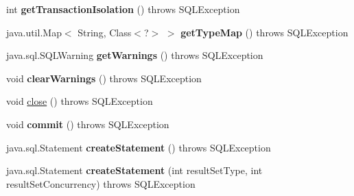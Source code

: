 \begin{DoxyCompactItemize}
\mbox{\label{classcom_1_1mysql_1_1cj_1_1jdbc_1_1_connection_wrapper_a5a460da4650ce588704afa3bc76f20e0}} 
int {\bfseries get\+Transaction\+Isolation} ()  throws S\+Q\+L\+Exception 
\item 
\mbox{\label{classcom_1_1mysql_1_1cj_1_1jdbc_1_1_connection_wrapper_a5937fe77552189bdc479b80bc84bf5df}} 
java.\+util.\+Map$<$ String, Class$<$?$>$ $>$ {\bfseries get\+Type\+Map} ()  throws S\+Q\+L\+Exception 
\item 
\mbox{\label{classcom_1_1mysql_1_1cj_1_1jdbc_1_1_connection_wrapper_a645cbeafc87a13f65c6ca3596837ec10}} 
java.\+sql.\+S\+Q\+L\+Warning {\bfseries get\+Warnings} ()  throws S\+Q\+L\+Exception 
\item 
\mbox{\label{classcom_1_1mysql_1_1cj_1_1jdbc_1_1_connection_wrapper_a4113e07bce13394b2537c5f9e7aba3ae}} 
void {\bfseries clear\+Warnings} ()  throws S\+Q\+L\+Exception 
\item 
void \mbox{\hyperlink{classcom_1_1mysql_1_1cj_1_1jdbc_1_1_connection_wrapper_a1513ad5e208ca46ac61ab5359590a0b9}{close}} ()  throws S\+Q\+L\+Exception 
\item 
\mbox{\label{classcom_1_1mysql_1_1cj_1_1jdbc_1_1_connection_wrapper_af0bc67720997910c2dec3f38b1796ec1}} 
void {\bfseries commit} ()  throws S\+Q\+L\+Exception 
\item 
\mbox{\label{classcom_1_1mysql_1_1cj_1_1jdbc_1_1_connection_wrapper_a7d05b731c9391bc085142ba228bad83a}} 
java.\+sql.\+Statement {\bfseries create\+Statement} ()  throws S\+Q\+L\+Exception 
\item 
\mbox{\label{classcom_1_1mysql_1_1cj_1_1jdbc_1_1_connection_wrapper_a3d31ddf344c72fe4d0f8cb8346cbfc71}} 
java.\+sql.\+Statement {\bfseries create\+Statement} (int result\+Set\+Type, int result\+Set\+Concurrency)  throws S\+Q\+L\+Exception 
\item 
\mbox{\label{classcom_1_1mysql_1_1cj_1_1jdbc_1_1_connection_wrapper_a2535bed73382de6da54c5efa8e014089}} 

\end{DoxyCompactItemize}
